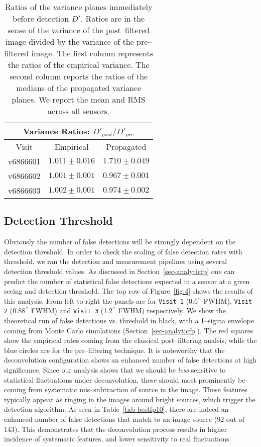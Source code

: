 \documentclass[iop]{emulateapj}
\begin{document}
\begin{table*}[t]
\centering
\begin{tabular}{ccc}
\hline
\multicolumn{3}{|c|}{Variance Ratios: $D'_{post} / D'_{pre}$} \\
\hline
Visit    & Empirical & Propagated \\
\hline
v6866601 & $1.011 \pm 0.016$    & $1.710 \pm 0.049$    \\
v6866602 & $1.001 \pm 0.001$    & $0.967 \pm 0.001$    \\
v6866603 & $1.002 \pm 0.001$    & $0.974 \pm 0.002$    \\
\end{tabular}
\caption{{\rm Ratios of the variance planes immediately before detection $D'$.
  Ratios are in the sense of the variance of the post--filtered image divided by the variance of the pre--filtered image.
  The first column represents the ratios of the empirical variance.
  The second column reports the ratios of the medians of the propagated variance planes.
  We report the mean and RMS across all sensors.
\label{tab-variance2}}}
\end{table*}


\subsection{Detection Threshold}
Obviously the number of false detections will be strongly dependent on the detection threshold.
In order to check the scaling of false detection rates with threshold, we ran the detection and measurement pipelines using several detection threshold values.
As discussed in Section~\ref{sec-analyticfp} one can predict the number of statistical false detections expected in a sensor at a given seeing and detection threshold.
The top row of Figure~\ref{fig:4} shows the results of this analysis.
From left to right the panels are for {\tt Visit 1} (0.6$^{\prime\prime}$ FWHM), {\tt Visit 2} (0.88$^{\prime\prime}$ FWHM) and {\tt Visit 3} (1.2$^{\prime\prime}$ FWHM) respectively.
We show the theoretical run of false detections vs. threshold in black, with a 1--sigma envelope coming from Monte Carlo simulations (Section~\ref{sec-analyticfp}).
The red squares show the empirical rates coming from the classical post--filtering analsis, while the blue circles are for the pre--filtering technique.
It is noteworthy that the deconvolution configuration shows an enhanced number of false detections at high significance.
Since our analysis shows that we should be {\it less} sensitive to statistical fluctuations under deconvolution, these should most prominently be coming from systematic mis--subtraction of source in the image.
These features typically appear as ringing in the images around bright sources, which trigger the detection algorithm.
As seen in Table~\ref{tab-bestfp10}, there are indeed an enhanced number of false detections that match to an image source (92 out of 143).
This demonstrates that the deconvolution process results in higher incidence of systematic features, and lower sensitivity to real fluctuations.
\end{document}
